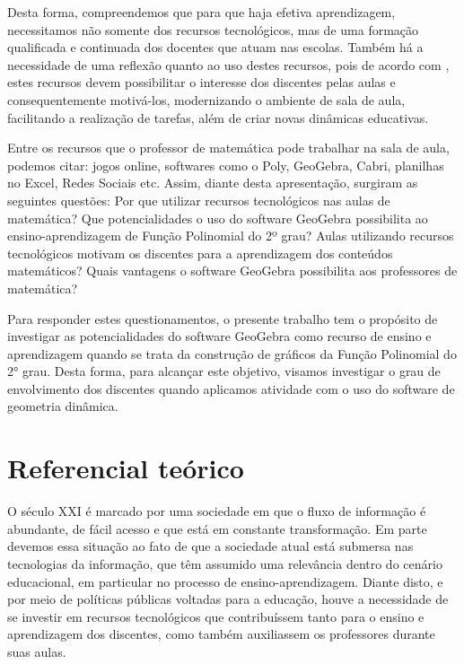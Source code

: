 \begin{refsection}
    Desta forma, compreendemos que para que haja efetiva aprendizagem, necessitamos não somente dos recursos tecnológicos, mas de uma formação qualificada e continuada dos docentes que atuam nas escolas. Também há a necessidade de uma reflexão quanto ao uso destes recursos, pois de acordo com \textcite[p.~105]{CARNEIROAndoAndPASSOS2014utilização}, estes recursos devem possibilitar o interesse dos discentes pelas aulas e consequentemente motivá-los, modernizando o ambiente de sala de aula, facilitando a realização de tarefas, além de criar novas dinâmicas educativas.       

    Entre os recursos que o professor de matemática pode trabalhar na sala de aula, podemos citar: jogos online, softwares como o Poly, GeoGebra, Cabri, planilhas no Excel, Redes Sociais etc. Assim, diante desta apresentação, surgiram as seguintes questões: Por que utilizar recursos tecnológicos nas aulas de matemática? Que potencialidades o uso do software GeoGebra possibilita ao ensino-aprendizagem de Função Polinomial do 2º grau? Aulas utilizando recursos tecnológicos motivam os discentes para a aprendizagem dos conteúdos matemáticos? Quais vantagens o software GeoGebra possibilita aos professores de matemática? 

    Para responder estes questionamentos, o presente trabalho tem o propósito de investigar as potencialidades do software GeoGebra como recurso de ensino e aprendizagem quando se trata da construção de gráficos da Função Polinomial do 2° grau. Desta forma, para alcançar este objetivo, visamos investigar o grau de envolvimento dos discentes quando aplicamos atividade com o uso do software de geometria dinâmica. 



    \section{Referencial teórico}

    O século XXI é marcado por uma sociedade em que o fluxo de informação é abundante, de fácil acesso e que está em constante transformação. Em parte devemos essa situação ao fato de que a sociedade atual está submersa nas tecnologias da informação, que têm assumido uma relevância dentro do cenário educacional, em particular no processo de ensino-aprendizagem. Diante disto, e por meio de políticas públicas voltadas para a educação, houve a necessidade de se investir em recursos tecnológicos que contribuíssem tanto para o ensino e aprendizagem dos discentes, como também auxiliassem os professores durante suas aulas.  


\end{refsection}
